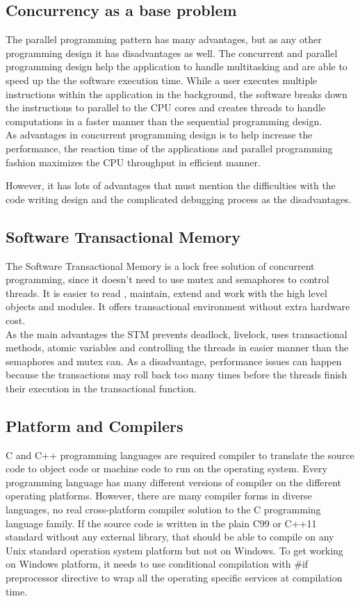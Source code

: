 \documentclass[12pt]{article}
\begin{document}
{\subsection{Concurrency as a base problem}
The parallel programming pattern has many advantages, but as any other programming design it has disadvantages as well. The concurrent and parallel programming design help the application to handle multitasking and are able to speed up the the software execution time. While a user executes multiple instructions within the application in the background, the software breaks down the instructions to parallel to the CPU cores and creates threads to handle computations in a faster manner than the sequential programming design.\\ 

As advantages in concurrent programming design  is to help increase the performance, the reaction time of the applications and parallel programming fashion maximizes the CPU throughput in efficient manner. 

However, it has lots of advantages that must mention the difficulties with the code writing design and the complicated debugging process as the disadvantages.   

\subsection{Software Transactional Memory}
The Software Transactional Memory is a lock free solution of concurrent programming, since it doesn't need to use mutex and semaphores to control threads. It is easier to read , maintain, extend and work with the high level objects and modules. It offers transactional environment without extra hardware cost.\\ 

As the main advantages the STM prevents deadlock, livelock, uses transactional methods, atomic variables and controlling the threads in easier manner than the semaphores and mutex can. As a disadvantage, performance issues can happen because the transactions may roll back too many times before the threads finish their execution in the transactional function.\\

\subsection{Platform and Compilers}
C and C++ programming languages are required compiler to translate the source code to object code or machine code to run on the operating system. Every programming language has many different versions of compiler on the different operating platforms. However, there are many compiler forms in  diverse languages, no real cross-platform compiler solution to the C programming language family. If the source code is written in the plain C99 or C++11 standard without any external library, that should be able to compile on any Unix standard operation system platform but not on Windows. To get working on Windows platform, it needs to use conditional compilation with \#if preprocessor directive to wrap all the operating specific services at compilation time.\\ 

}
\end{document}

